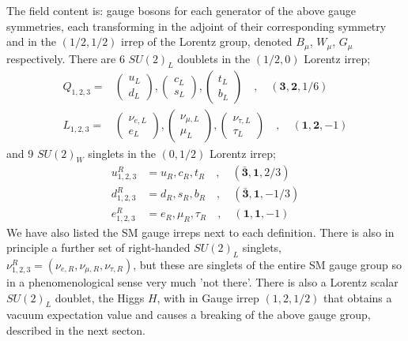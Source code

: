 The field content is: gauge bosons for each generator of the above gauge symmetries, each transforming in the adjoint of their corresponding symmetry and in the $(1/2,1/2)$ irrep of the Lorentz group, denoted $B_{\mu}$, $W_{\mu}$, $G_{\mu}$ respectively. There are 6 $SU(2)_L$ doublets in the $(1/2,0)$ Lorentz irrep;
\begin{align}
  Q_{1,2,3} =&
  \begin{pmatrix} u_L \\ d_L \end{pmatrix},
  \begin{pmatrix} c_L \\ s_L \end{pmatrix},
  \begin{pmatrix} t_L \\ b_L \end{pmatrix}
  \quad,\quad
  (\mathbf{3},\mathbf{2},1/6) \\
  L_{1,2,3} =&
  \begin{pmatrix} \nu_{e,L} \\ e_L \end{pmatrix},
  \begin{pmatrix} \nu_{\mu,L} \\ \mu_L \end{pmatrix},
  \begin{pmatrix} \nu_{\tau,L} \\ \tau_L \end{pmatrix}
  \quad,\quad
  (\mathbf{1},\mathbf{2},-1)
\end{align}
and 9 $SU(2)_W$ singlets in the $(0,1/2)$ Lorentz irrep;
\begin{align}
  u^R_{1,2,3} &= u_R, c_R, t_R\quad,\quad (\bar{\mathbf{3}},\mathbf{1},2/3) \\
  d^R_{1,2,3} &= d_R, s_R, b_R\quad,\quad (\bar{\mathbf{3}},\mathbf{1},-1/3) \\
  e^R_{1,2,3} &= e_R, \mu_R, \tau_R\quad,\quad (\mathbf{1},\mathbf{1},-1)
\end{align}
We have also listed the SM gauge irreps next to each definition. There is also in principle a further set of right-handed $SU(2)_L$ singlets, $\nu^R_{1,2,3} = (\nu_{e,R}, \nu_{\mu,R}, \nu_{\tau,R})$, but these are singlets of the entire SM gauge group so in a phenomenological sense very much 'not there'. There is also a Lorentz scalar $SU(2)_L$ doublet, the Higgs $H$, with in Gauge irrep $(1,2,1/2)$ that obtains a vacuum expectation value and causes a breaking of the above gauge group, described in the next secton.
\\ \\
